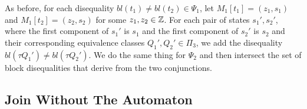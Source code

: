 As before, for each disequality $bl(t_1) \neq bl(t_2) \in \Psi_1$, let $M_1[t_1] = (z_1, s_1)$ and $M_1[t_2] = (z_2, s_2)$ for some $z_1,z_2\in \mathbb{Z}$.
For each pair of states $s_1', s_2'$, where the first component of $s_1'$ is $s_1$ and the first component of $s_2'$ is $s_2$ and their corresponding equivalence classes $Q_1', Q_2' \in \Pi_3$, we add the disequality $bl(\tau Q_1') \neq bl(\tau Q_2')$.
We do the same thing for $\Psi_2$ and then intersect the set of block disequalities that derive from the two conjunctions.

\subsection{Join Without The Automaton}
